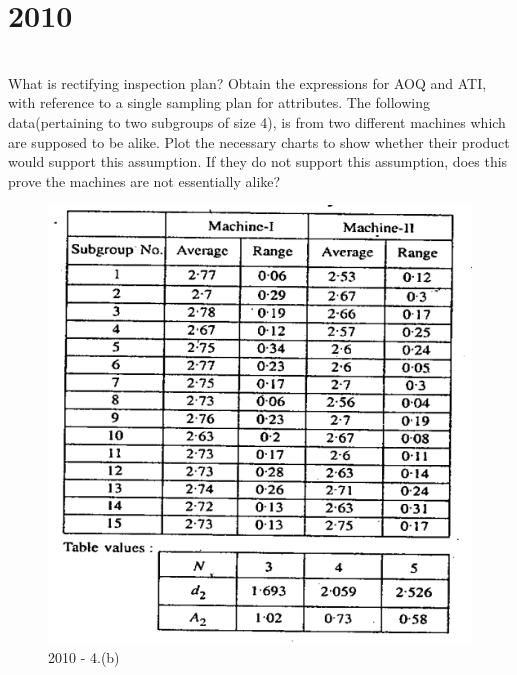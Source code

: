 \section*{2010}
\vspace{-.5cm}
\hrulefill \smallskip\\
 What is rectifying inspection plan? Obtain the expressions for AOQ and ATI, with reference to a single sampling plan for attributes.
\myline
{} The following data(pertaining to two subgroups of size 4), is from two different machines which are supposed to be alike. Plot the necessary charts to show whether their product would support this assumption.  If they do not support this assumption, does this prove the machines are not essentially alike?
\begin{figure}[h!]
    \centering
    \includegraphics[]{IS/QC/4c2010.PNG}
    \caption{2010 - 4.(b)}
\end{figure}

